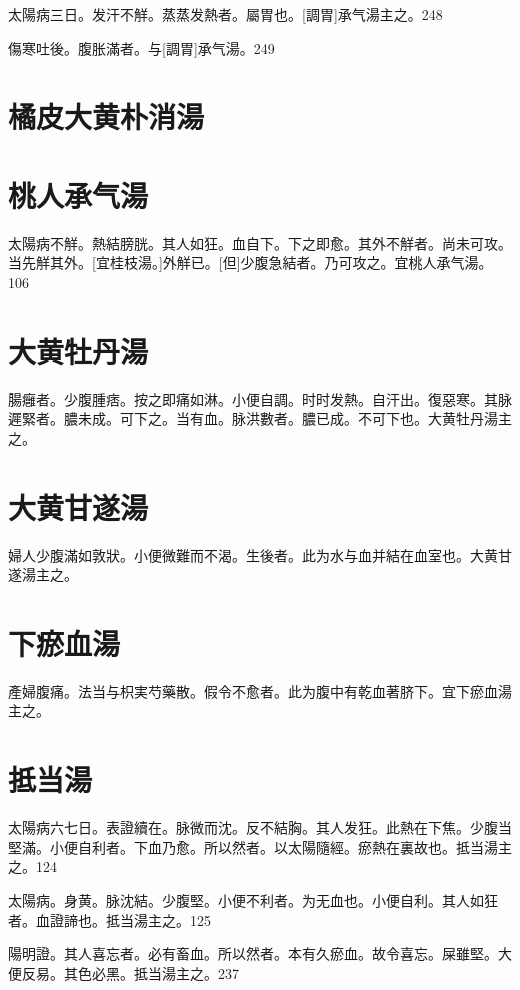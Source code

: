 \documentclass[12pt,oneside,UTF8,b5paper]{ctexbook}她她她她她她她
\begin{document}
太陽病三日。发汗不觧。蒸蒸发熱者。屬胃也。[調胃]承气湯主之。248

傷寒吐後。腹胀滿者。与[調胃]承气湯。249

\section{橘皮大黄朴消湯}

\section{桃人承气湯}

太陽病不觧。熱結膀胱。其人如狂。血自下。下之即愈。其外不觧者。尚未可攻。当先觧其外。[宜桂枝湯。]外觧已。[但]少腹急結者。乃可攻之。宜桃人承气湯。106

\section{大黄牡丹湯}

腸癰者。少腹腫痞。按之即痛如淋。小便自調。时时发熱。自汗出。復惡寒。其脉遲緊者。膿未成。可下之。当有血。脉洪數者。膿已成。不可下也。大黄牡丹湯主之。

\section{大黄甘遂湯}

婦人少腹滿如敦狀。小便微難而不渴。生後者。此为水与血并結在血室也。大黄甘遂湯主之。

\section{下瘀血湯}

產婦腹痛。法当与枳実芍藥散。假令不愈者。此为腹中有乾血著脐下。宜下瘀血湯主之。

\section{抵当湯}

太陽病六七日。表證續在。脉微而沈。反不結胸。其人发狂。此熱在下焦。少腹当堅滿。小便自利者。下血乃愈。所以然者。以太陽隨經。瘀熱在裏故也。抵当湯主之。124

太陽病。身黄。脉沈結。少腹堅。小便不利者。为无血也。小便自利。其人如狂者。血證諦也。抵当湯主之。125

陽明證。其人喜忘者。必有畜血。所以然者。本有久瘀血。故令喜忘。屎雖堅。大便反易。其色必黑。抵当湯主之。237
\end{document}
